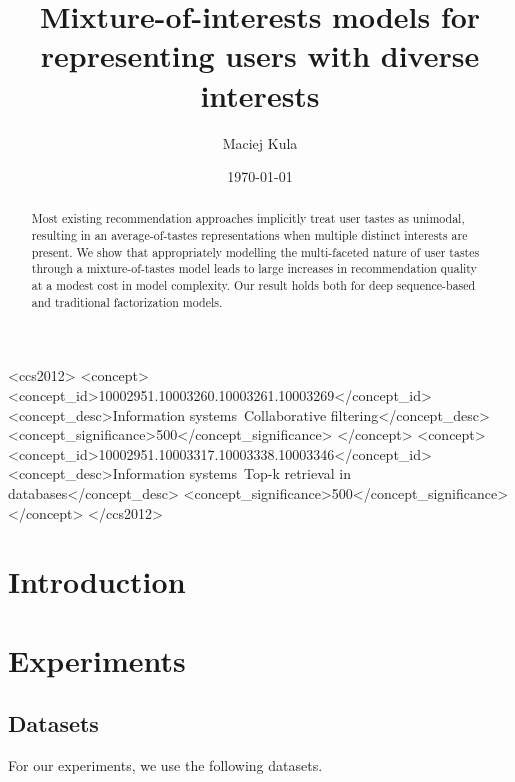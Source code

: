 \documentclass[sigchi]{acmart}
\begin{document}
\title{Mixture-of-interests models for representing users with diverse interests}
\author{Maciej Kula}
\date{\today}
\acmConference[]{}{}{}

\begin{CCSXML}
<ccs2012>
<concept>
<concept_id>10002951.10003260.10003261.10003269</concept_id>
<concept_desc>Information systems~Collaborative filtering</concept_desc>
<concept_significance>500</concept_significance>
</concept>
<concept>
<concept_id>10002951.10003317.10003338.10003346</concept_id>
<concept_desc>Information systems~Top-k retrieval in databases</concept_desc>
<concept_significance>500</concept_significance>
</concept>
</ccs2012>
\end{CCSXML}




\begin{abstract}
Most existing recommendation approaches implicitly treat user tastes as unimodal, resulting in an average-of-tastes representations when multiple distinct interests are present. We show that appropriately modelling the multi-faceted nature of user tastes through a mixture-of-tastes model leads to large increases in recommendation quality at a modest cost in model complexity. Our result holds both for deep sequence-based and traditional factorization models. 
\end{abstract}

\maketitle


\section{Introduction}



\section{Experiments}
\subsection{Datasets}
For our experiments, we use the following datasets.
\end{document}
